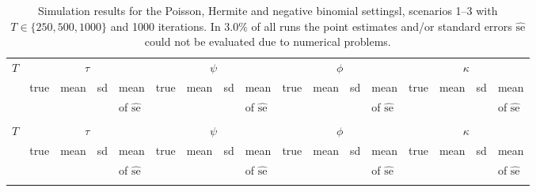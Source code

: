 \documentclass{article}
\begin{document}
\begin{table}[h!]
\footnotesize
\caption{Simulation results for the Poisson, Hermite and negative binomial settingsl, scenarios 1--3 with $T \in \{250, 500, 1000\}$ and 1000 iterations. In 3.0\% of all runs the point estimates and/or standard errors $\widehat{\text{se}}$ could not be evaluated due to numerical problems.}

\center
\medskip
\label{tab:sim_hermite}
\begin{tabular}{p{0.3cm} @{\hskip 0.7cm} p{0.45cm} p{0.45cm} p{0.45cm} p{0.45cm} @{\hskip 0.7cm} p{0.45cm} p{0.45cm} p{0.45cm} p{0.45cm} @{\hskip 0.7cm} p{0.45cm} p{0.45cm} p{0.45cm} p{0.45cm} @{\hskip 0.7cm} p{0.45cm} @{\hskip 0.45cm} p{0.45cm} p{0.45cm} p{0.65cm}}
\hline\noalign{\bigskip}
\multicolumn{17}{c}{Hermite}\\
\hline\noalign{\smallskip}
$T$ & \multicolumn{4}{c}{$\tau$} & \multicolumn{4}{c}{$\psi$} & \multicolumn{4}{c}{$\phi$} & \multicolumn{4}{c}{$\kappa$}\\
 \noalign{\smallskip}\hline\noalign{\smallskip}
& true & mean & sd & mean & true & mean & sd & mean & true & mean & sd & mean & true & mean & sd & mean \\
& & & & of $\widehat{\text{se}}$ & & & & of $\widehat{\text{se}}$ & & & & of $\widehat{\text{se}}$ & & & & of $\widehat{\text{se}}$\\
\noalign{\smallskip}\hline\noalign{\smallskip}

\noalign{\smallskip}\hline\noalign{\smallskip}

\noalign{\smallskip}\hline\noalign{\smallskip}

\noalign{\smallskip}\hline\noalign{\bigskip}
\multicolumn{17}{c}{Negative binomial}\\
\hline\noalign{\smallskip}
$T$ & \multicolumn{4}{c}{$\tau$} & \multicolumn{4}{c}{$\psi$} & \multicolumn{4}{c}{$\phi$} & \multicolumn{4}{c}{$\kappa$}\\
 \noalign{\smallskip}\hline\noalign{\smallskip}
& true & mean & sd & mean & true & mean & sd & mean & true & mean & sd & mean & true & mean & sd & mean \\
& & & & of $\widehat{\text{se}}$ & & & & of $\widehat{\text{se}}$ & & & & of $\widehat{\text{se}}$ & & & & of $\widehat{\text{se}}$\\
\noalign{\smallskip}\hline\noalign{\smallskip}

\noalign{\smallskip}\hline\noalign{\smallskip}

\noalign{\smallskip}\hline\noalign{\smallskip}

\noalign{\smallskip}\hline\noalign{\smallskip}
\end{tabular}
\end{table}
\end{document}
